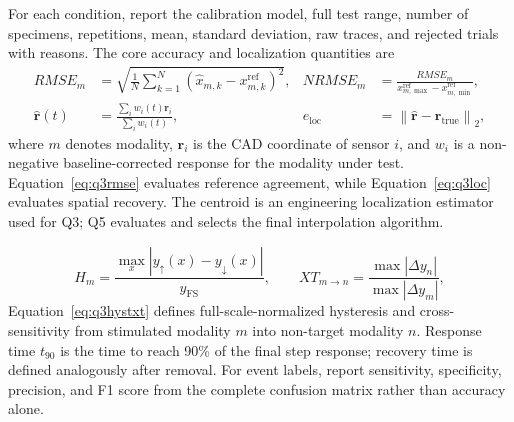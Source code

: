 {\fontsize{9.25}{10.95}\selectfont
For each condition, report the calibration model, full test range, number of
specimens, repetitions, mean, standard deviation, raw traces, and rejected
trials with reasons. The core accuracy and localization quantities are
\begin{align}
 RMSE_m &=\sqrt{\frac{1}{N}\sum_{k=1}^{N}
   \left(\widehat{x}_{m,k}-x_{m,k}^{\mathrm{ref}}\right)^2},
 & NRMSE_m&=\frac{RMSE_m}{x_{m,\max}^{\mathrm{ref}}-x_{m,\min}^{\mathrm{ref}}},
 \label{eq:q3rmse}\\
 \widehat{\mathbf r}(t)&=
 \frac{\sum_i w_i(t)\mathbf r_i}{\sum_i w_i(t)},
 & e_{\mathrm{loc}}&=\left\|\widehat{\mathbf r}-\mathbf r_{\mathrm{true}}\right\|_2,
 \label{eq:q3loc}
\end{align}
where $m$ denotes modality, $\mathbf r_i$ is the CAD coordinate of sensor $i$,
and $w_i$ is a non-negative baseline-corrected response for the modality under
test. Equation~\eqref{eq:q3rmse} evaluates reference agreement, while
Equation~\eqref{eq:q3loc} evaluates spatial recovery. The centroid is an
engineering localization estimator used for Q3; Q5 evaluates and selects the
final interpolation algorithm.\par

\begin{equation}
 H_m=\frac{\max_x|y_{\uparrow}(x)-y_{\downarrow}(x)|}{y_{\mathrm{FS}}},
 \qquad
 XT_{m\rightarrow n}=\frac{\max|\Delta y_n|}{\max|\Delta y_m|},
 \label{eq:q3hystxt}
\end{equation}
Equation~\eqref{eq:q3hystxt} defines full-scale-normalized hysteresis and
cross-sensitivity from stimulated
modality $m$ into non-target modality $n$. Response time $t_{90}$ is the time
to reach 90\% of the final step response; recovery time is defined analogously
after removal. For event labels, report sensitivity, specificity, precision,
and F1 score from the complete confusion matrix rather than accuracy alone.\par}

